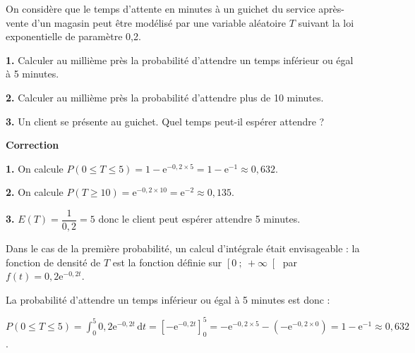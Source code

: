 \documentclass{cornouaille}
\begin{document}
\begin{methode}
\exercice
On considère que le temps d'attente en minutes à un guichet du service après-vente d'un magasin peut être modélisé par une variable aléatoire $T$ suivant la loi exponentielle de paramètre 0,2.




\textbf{1. } Calculer au millième près la probabilité d'attendre un temps inférieur ou égal à 5 minutes.


\textbf{2. } Calculer au millième près la probabilité d'attendre plus de 10 minutes.


\textbf{3. } Un client se présente au guichet. Quel temps peut-il \og espérer \fg{} attendre ?



\textbf{Correction}





\textbf{1. } On calcule $P(0\leqslant T \leqslant 5)=1-\textrm{e}^{-0,2\times 5}=1-\textrm{e}^{-1}\approx 0,632$.


\textbf{2. } On calcule $P(T \geqslant 10)=\textrm{e}^{-0,2 \times 10}=\textrm{e}^{-2}\approx 0,135$.


\textbf{3. } $E(T)=\dfrac{1}{0,2}=5$ donc le client peut espérer attendre 5 minutes.




\end{methode}





\begin{remarque}
Dans le cas de la première probabilité, un calcul d'intégrale était envisageable : la fonction de densité de $T$ est la fonction définie sur $\left[0\ ;\ +\infty \right[$ par $f(t)=0,2\textrm{e}^{-0,2t}$.

La probabilité d'attendre un temps inférieur ou égal à 5 minutes est donc :

$P(0\leqslant T \leqslant 5)=\displaystyle \int_{0}^{5} 0,2\textrm{e}^{-0,2t} \, \textrm{d}t=\left[-\textrm{e}^{-0,2t}\right]_{0}^{5}=-\textrm{e}^{-0,2\times5}-\left(-\textrm{e}^{-0,2\times0}\right)=1-\textrm{e}^{-1}\approx 0,632$.
\end{remarque}
\end{document}
